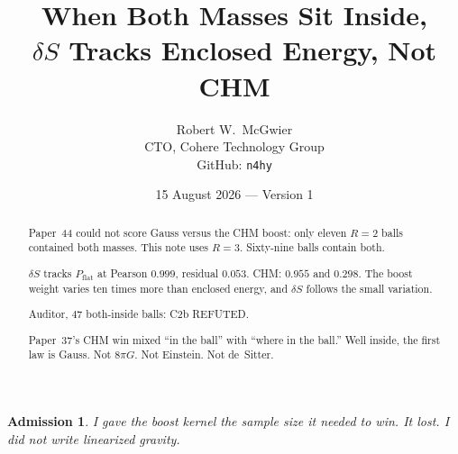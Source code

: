 \documentclass[11pt]{article}
\title{\textbf{When Both Masses Sit Inside,\\
$\delta S$ Tracks Enclosed Energy, Not CHM}}
\author{Robert W.\ McGwier\\
\small CTO, Cohere Technology Group\\
\small GitHub: \texttt{n4hy}}
\date{15 August 2026 --- Version 1}
\newtheorem*{admission}{Admission}
\begin{document}
\maketitle

\begin{abstract}
\noindent
Paper~44 could not score Gauss versus the CHM boost:
only eleven $R=2$ balls contained both masses. This
note uses $R=3$. Sixty-nine balls contain both.

$\delta S$ tracks $P_{\mathrm{flat}}$ at Pearson $0.999$,
residual $0.053$. CHM: $0.955$ and $0.298$. The boost
weight varies ten times more than enclosed energy, and
$\delta S$ follows the small variation.

Auditor, $47$ both-inside balls: C2b REFUTED.

Paper~37's CHM win mixed ``in the ball'' with ``where
in the ball.'' Well inside, the first law is Gauss.
Not $8\pi G$. Not Einstein. Not de~Sitter.
\end{abstract}

\begin{admission}
I gave the boost kernel the sample size it needed to win.
It lost. I did not write linearized gravity.
\end{admission}
\end{document}
